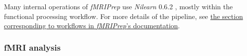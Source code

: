 \begin{description}
\end{description}

Many internal operations of \emph{fMRIPrep} use \emph{Nilearn} 0.6.2
\citep[RRID:SCR\_001362]{nilearn}, mostly within the functional
processing workflow. For more details of the pipeline, see
\href{https://fmriprep.readthedocs.io/en/latest/workflows.html}{the
section corresponding to workflows in \emph{fMRIPrep}'s documentation}.


\subsubsection{fMRI analysis}

